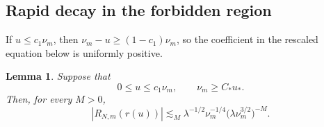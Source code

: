 \documentclass[10pt,a4paper]{amsart}
\newtheorem{lemma}[theorem]{Lemma}
\numberwithin{equation}{section}
\begin{document}
\subsection{Rapid decay in the forbidden region}

If \(u\le c_1\nu_m\), then
\(\nu_m-u\ge(1-c_1)\nu_m\), so the coefficient in the rescaled equation
below is uniformly positive.

\begin{lemma}\label{lem:forbidden-radial}
Suppose that
\[
 0\le u\le c_1\nu_m,
 \qquad \nu_m\ge C_*u_*.
\]
Then, for every \(M>0\),
\begin{equation}\label{eq:forbidden-radial}
 |R_{N,m}(r(u))|
 \lesssim_M
 \lambda^{-1/2}\nu_m^{-1/4}
 \bigl(\lambda\nu_m^{3/2}\bigr)^{-M}.
\end{equation}
\end{lemma}
\end{document}
